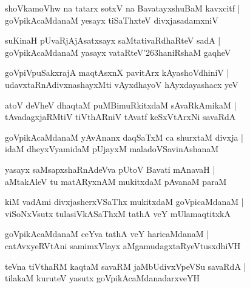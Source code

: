 \documentclass[twoside,12pt,openright]{book}
\def\S{\char'263}
\newcounter{shloka}[chapter]
\begin{document}
\begin{shloka}%
shoVkamoVhw na tatarx sotxV na BavatayxshuBaM kavxcitf |\\
goVpikAcaMdanaM yesayx tiSaThxteV divxjasadamxniV
\end{shloka}

\begin{shloka}%
suKinaH pUvaRjAjAsatxsayx saMtativaRdhaRteV sadA |\\
goVpikAcaMdanaM yasayx vataRteV\S haniRshaM gaqheV 
\end{shloka}

\begin{shloka}%
goVpiVpuSakxrajA maqtAsxnX pavitArx kAyashoVdhiniV |\\
udavxtaRnAdivxnashayxMti vAyxdhayoV hAyxdayashacx yeV 
\end{shloka}

\begin{shloka}%
atoV deVheV dhaqtaM puMBimuRkitxdaM sAvaRkAmikaM |\\
tAvadagxjaRMtiV tiVthARniV tAvatf keSxVtArxNi savaRdA 
\end{shloka}

\begin{shloka}%
goVpikAcaMdanaM yAvAnanx daqSaTxM ca shurxtaM divxja |\\
idaM dheyxVyamidaM pUjayxM maladoVSavinAshanaM 
\end{shloka}

\begin{shloka}%
yasayx saMsapxshaRnAdeVva pUtoV Bavati mAnavaH |\\
aMtakAleV tu matARyxnAM mukitxdaM pAvanaM paraM 
\end{shloka}

\begin{shloka}%
kiM vadAmi divxjasherxVSaThx mukitxdaM goVpicaMdanaM |\\
viSoNxVsutx tulasiVkASaThxM tathA veY mUlamaqtitxkA
\end{shloka}

\begin{shloka}%
goVpikAcaMdanaM ceYva tathA veY haricaMdanaM |\\
catAvxyeRVtAni samimxVlayx aMgamudagxtaRyeVtusxdhiVH 
\end{shloka}

\begin{shloka}%
teVna tiVthaRM kaqtaM savaRM jaMbUdivxVpeVSu savaRdA |\\
tilakaM kuruteV yasutx goVpikAcaMdanadarxveYH
\end{shloka}
\end{document}
